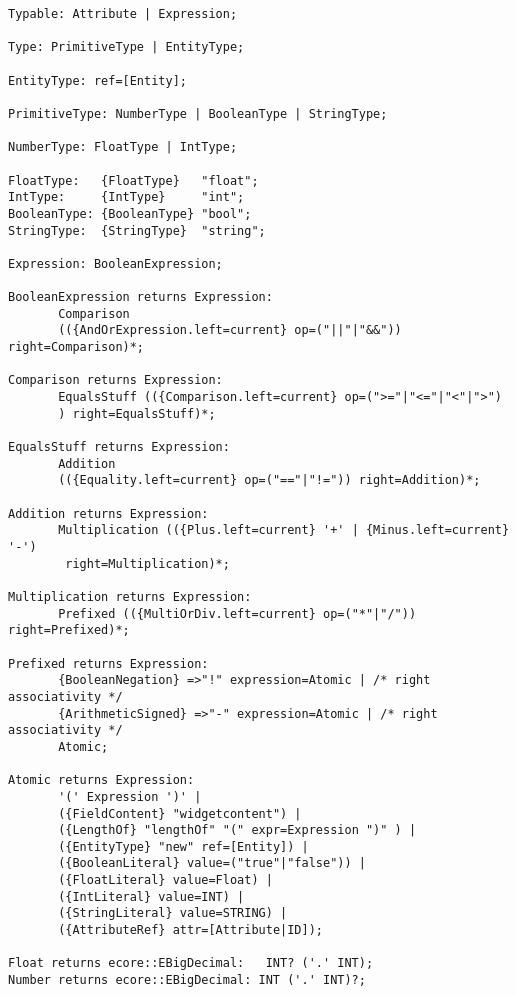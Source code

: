 \begin{lstlisting}[language=xtext,float,label=lst:grammar-plain-types-and-ex,caption=Types
and Expressions.] 
Typable: Attribute | Expression;

Type: PrimitiveType | EntityType;

EntityType: ref=[Entity];

PrimitiveType: NumberType | BooleanType | StringType;

NumberType: FloatType | IntType;

FloatType:   {FloatType}   "float";
IntType:     {IntType}     "int";
BooleanType: {BooleanType} "bool";
StringType:	 {StringType}  "string";

Expression: BooleanExpression;

BooleanExpression returns Expression:
       Comparison
       (({AndOrExpression.left=current} op=("||"|"&&")) right=Comparison)*;

Comparison returns Expression:
       EqualsStuff (({Comparison.left=current} op=(">="|"<="|"<"|">")
       ) right=EqualsStuff)*;

EqualsStuff returns Expression:
       Addition 
       (({Equality.left=current} op=("=="|"!=")) right=Addition)*;

Addition returns Expression:
       Multiplication (({Plus.left=current} '+' | {Minus.left=current} '-') 
        right=Multiplication)*;

Multiplication returns Expression:
       Prefixed (({MultiOrDiv.left=current} op=("*"|"/")) right=Prefixed)*;

Prefixed returns Expression:
       {BooleanNegation} =>"!" expression=Atomic | /* right associativity */
       {ArithmeticSigned} =>"-" expression=Atomic | /* right associativity */
       Atomic;

Atomic returns Expression:
       '(' Expression ')' |
       ({FieldContent} "widgetcontent") |
       ({LengthOf} "lengthOf" "(" expr=Expression ")" ) |
       ({EntityType} "new" ref=[Entity]) | 
       ({BooleanLiteral} value=("true"|"false")) |
       ({FloatLiteral} value=Float) |
       ({IntLiteral} value=INT) |
       ({StringLiteral} value=STRING) |
       ({AttributeRef} attr=[Attribute|ID]);

Float returns ecore::EBigDecimal:   INT? ('.' INT);
Number returns ecore::EBigDecimal: INT ('.' INT)?;
\end{lstlisting}

%


